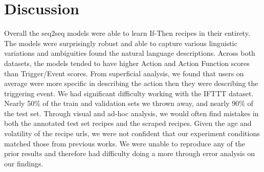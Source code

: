 \documentclass[letterpaper]{article} %
\begin{document}
\begin{table}
\centering
{}
\caption{Distribution of errors across all predictions by domain. }
\label{tab:error}
\end{table}

\section{Discussion}
Overall the seq2seq models were able to learn If-Then recipes in their entirety. The models were surprisingly robust and able to capture various linguistic variations and ambiguities found the natural language descriptions. Across both datasets, the models tended to have higher Action and Action Function scores than Trigger/Event scores. From superficial analysis, we found that users on average were more specific in describing the action then they were describing the triggering event.  We had significant difficulty working with the IFTTT dataset. Nearly 50\% of the train and validation sets we thrown away, and nearly 90\% of the test set. Through visual and ad-hoc analysis, we would often find mistakes in both the annotated test set recipes and the scraped recipes. Given the age and volatility of the recipe urls, we were not confident that our experiment conditions matched those from previous works. We were unable to reproduce any of the prior results and therefore had difficulty doing a more through error analysis on our findings.
\end{document}
